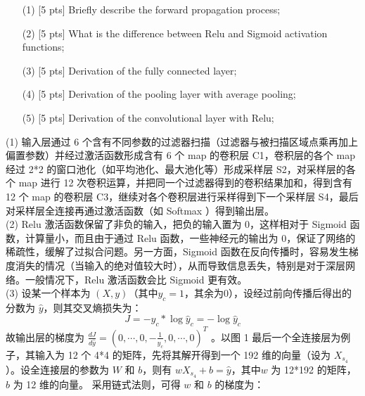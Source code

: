 \documentclass{article}
\begin{document}
    \begin{enumerate}
    	\item [(1)] [5 pts] Briefly describe the forward propagation process;
    	\item [(2)] [5 pts] What is the difference between Relu and Sigmoid activation functions;
		\item [(3)] [5 pts] Derivation of the fully connected layer;
   		\item [(4)] [5 pts] Derivation of the pooling layer with average pooling;
    	\item [(5)] [5 pts] Derivation of the convolutional layer with Relu;
    \end{enumerate}
	(1) 输入层通过 6 个含有不同参数的过滤器扫描（过滤器与被扫描区域点乘再加上偏置参数）并经过激活函数形成含有 6 个 map 的卷积层 C1，卷积层的各个 map 经过 2*2 的窗口池化（如平均池化、最大池化等）形成采样层 S2，对采样层的各个 map 进行 12 次卷积运算，并把同一个过滤器得到的卷积结果加和，得到含有 12 个 map 的卷积层 C3，继续对各个卷积层进行采样得到下一个采样层 S4，最后对采样层全连接再通过激活函数（如 Softmax ）得到输出层。\\
	(2)	Relu 激活函数保留了非负的输入，把负的输入置为 0，这样相对于 Sigmoid 函数，计算量小，而且由于通过 Relu 函数，一些神经元的输出为 0，保证了网络的稀疏性，缓解了过拟合问题。另一方面，Sigmoid 函数在反向传播时，容易发生梯度消失的情况（当输入的绝对值较大时），从而导致信息丢失，特别是对于深层网络。一般情况下，Relu 激活函数会比 Sigmoid 更有效。\\
	(3) 设某一个样本为 $(X, y)$（其中$y_c = 1$，其余为0），设经过前向传播后得出的分数为 $\hat{y}$，则其交叉熵损失为：
	\begin{equation}
		J = - y_c * \log\hat{y}_c = -\log\hat{y}_c
	\end{equation}
	故输出层的梯度为 $\frac{dJ}{d\hat{y}} = (0, \cdots, 0, -\frac{1}{\hat{y}_c}, 0, \cdots, 0)^T$ 。以图 1 最后一个全连接层为例子，其输入为 12 个 4*4 的矩阵，先将其解开得到一个 192 维的向量（设为 $X_{s_4}$）。设全连接层的参数为 $W$ 和 $b$，则有 $wX_{s_4} + b = \hat{y}$，其中$w$ 为 12*192 的矩阵，$b$ 为 12 维的向量。
	采用链式法则，可得 $w$ 和 $b$ 的梯度为：
\end{document}
